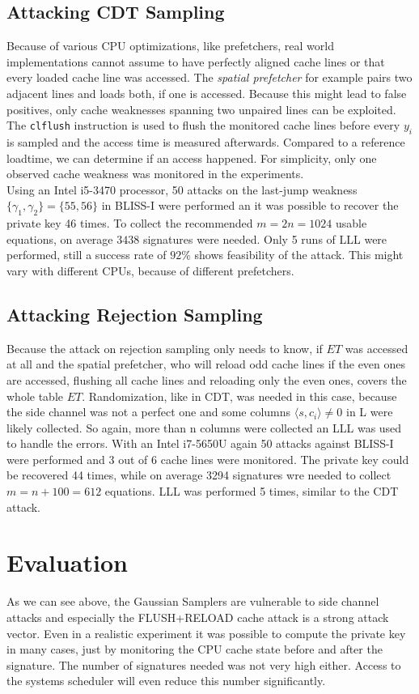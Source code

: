 \subsection{Attacking CDT Sampling}
Because of various CPU optimizations, like prefetchers, real world implementations cannot assume to have perfectly aligned cache lines or that every loaded cache line was accessed. The \textit{spatial prefetcher} for example pairs two adjacent lines and loads both, if one is accessed. Because this might lead to false positives, only cache weaknesses spanning two unpaired lines can be exploited. \\
The \verb|clflush| instruction is used to flush the monitored cache lines before every $y_i$ is sampled and the access time is measured afterwards. Compared to a reference loadtime, we can determine if an access happened. For simplicity, only one observed cache weakness was monitored in the experiments.\\
Using an Intel i5-3470 processor, 50 attacks on the last-jump weakness $\{\gamma_1, \gamma_2\} = \{55,56\}$ in BLISS-I were performed an it was possible to recover the private key 46 times. To collect the recommended $m = 2n = 1024$ usable equations, on average $3438$ signatures were needed. Only 5 runs of LLL were performed, still a success rate of $92\%$ shows feasibility of the attack. This might vary with different CPUs, because of different prefetchers.
\subsection{Attacking Rejection Sampling}
Because the attack on rejection sampling only needs to know, if $ET$ was accessed at all and the spatial prefetcher, who will reload odd cache lines if the even ones are accessed, flushing all cache lines and reloading only the even ones, covers the whole table $ET$. Randomization, like in CDT, was needed in this case, because the side channel was not a perfect one and some columns $\langle s, c_i \rangle \neq 0$ in L were likely collected. So again, more than n columns were collected an LLL was used to handle the errors. 
With an Intel i7-5650U again 50 attacks against BLISS-I were performed and 3 out of 6 cache lines were monitored. The private key could be recovered 44 times, while on average 3294 signatures wre needed to collect $m = n +100 = 612$ equations. LLL was performed 5 times, similar to the CDT attack.
\section{Evaluation}
As we can see above, the Gaussian Samplers are vulnerable to side channel attacks and especially the FLUSH+RELOAD cache attack is a strong attack vector. Even in a realistic experiment it was possible to compute the private key in many cases, just by monitoring the CPU cache state before and after the signature. The number of signatures needed was not very high either. Access to the systems scheduler will even reduce this number significantly.

